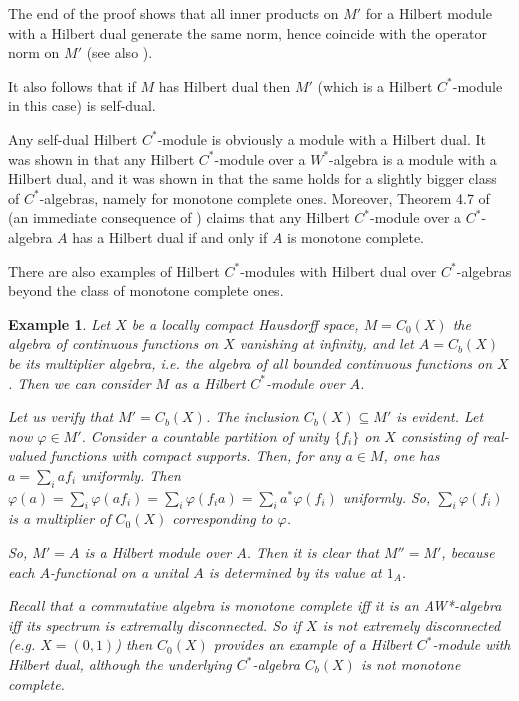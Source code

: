 \documentclass[12pt]{amsart}
\newtheorem{ex}[teo]{Example}
\def\f{{\varphi}}
\begin{document}
 The end of the proof shows that all inner products on $M'$ for a Hilbert module with a Hilbert dual
generate the same norm, hence coincide  with the operator norm on $M'$  (see also \cite[Propostion 3]{Manuilov2022}). 

 It also follows that if $M$ has Hilbert dual then $M'$ (which is a Hilbert $C^*$-module in this case) is self-dual.

 Any self-dual Hilbert $C^*$-module is obviously a module with a Hilbert dual. It was shown in \cite{Pas1} that any Hilbert $C^*$-module over a $W^*$-algebra is a module with a Hilbert dual, and it was shown in \cite{Hamana1992,Lin1992Pacific,FrankMaNa} that the same holds for a slightly bigger class of $C^*$-algebras, namely for monotone complete ones. Moreover, Theorem 4.7 of \cite{FrankMaNa} 
(an immediate consequence of \cite{Hamana1992})
claims that any Hilbert $C^*$-module over a $C^*$-algebra $A$ has a Hilbert dual if and only if $A$ is monotone complete.  

There are also examples of Hilbert $C^*$-modules with Hilbert dual over $C^*$-algebras beyond the class of monotone complete ones.

\begin{ex}
\rm
 Let $X$ be a locally compact Hausdorff space, $M=C_0(X)$ the algebra of continuous functions on $X$ vanishing at infinity, and let $A=C_b (X)$ be its multiplier algebra, i.e. the algebra of all bounded continuous functions on $X$. Then we can consider $M$ as a Hilbert $C^*$-module over $A$.

Let us verify that $M'=C_b (X)$. The inclusion $C_b (X) \subseteq M'$ is evident. Let now $\f\in M'$. Consider a countable partition of
unity $\{f_i\}$ on $X$ consisting of real-valued functions with compact supports. Then, for any $a \in M$, one has $a=\sum_i a f_i$ uniformly.
Then $\f(a)=\sum_i \f(a f_i)=\sum_i\f(f_i a)=\sum_i a^* \f(f_i)$ uniformly. So, $\sum_i \f(f_i)$ is a multiplier of $C_0(X)$ corresponding to $\f$.

So, $M'=A$ is a Hilbert module over $A$. Then it is clear that $M''=M'$, because each $A$-functional on a unital $A$ is determined by its value at $1_A$.


Recall that a commutative algebra is monotone complete iff it is an AW*-algebra iff its spectrum is extremally disconnected. So if $X$ is not extremely disconnected (e.g. $X=(0,1)$) then  $C_0(X)$ provides an example of a Hilbert $C^*$-module with Hilbert dual, although the underlying $C^*$-algebra $C_b(X)$ is not monotone complete. 
\end{ex}
\end{document}
